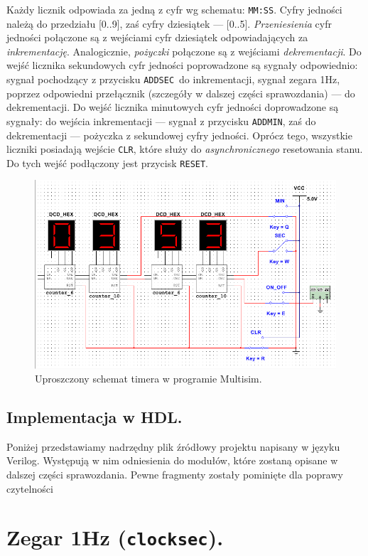 \documentclass[a4paper,oneside]{report}
\newcommand{\reset}{\texttt{RESET}}
\newcommand{\addmin}{\texttt{ADD\textunderscore MIN}}
\newcommand{\addsec}{\texttt{ADD\textunderscore SEC}}
\newcommand{\clocksec}{\texttt{clock\textunderscore sec}}
\begin{document}
Każdy licznik odpowiada za jedną z cyfr wg schematu: \texttt{MM:SS}.
Cyfry jedności należą do przedziału [0..9], zaś cyfry dziesiątek ---
[0..5]. \emph{Przeniesienia} cyfr jedności połączone są z wejściami
cyfr dziesiątek odpowiadających za \emph{inkrementację}.
Analogicznie, \emph{pożyczki} połączone są z wejściami
\emph{dekrementacji}. Do wejść licznika sekundowych cyfr jedności
poprowadzone są sygnały odpowiednio: sygnał pochodzący z przycisku
\addsec\ do inkrementacji, sygnał zegara 1Hz, poprzez odpowiedni
przełącznik (szczegóły w dalszej części sprawozdania) --- do
dekrementacji. Do wejść licznika minutowych cyfr jedności
doprowadzone są sygnały: do wejścia inkrementacji --- sygnał z
przycisku \addmin , zaś do dekrementacji --- pożyczka z sekundowej
cyfry jedności. Oprócz tego, wszystkie liczniki posiadają wejście
\texttt{CLR}, które służy do \emph{asynchronicznego} resetowania
stanu. Do tych wejść podłączony jest przycisk \reset .
\begin{figure}[p]
\centering
\includegraphics[width=\textwidth]{multisim/timer.png}
\caption[Uproszczony schemat timera.]{Uproszczony schemat timera w programie Multisim.}
\label{timer_scheme}
\end{figure}
\subsection{Implementacja w HDL.}
Poniżej przedstawiamy nadrzędny plik źródłowy projektu napisany w
języku Verilog. Występują w nim odniesienia do modułów, które
zostaną opisane w dalszej części sprawozdania. 
Pewne fragmenty zostały pominięte dla poprawy czytelności


\section{Zegar 1Hz (\clocksec).}
\end{document}

